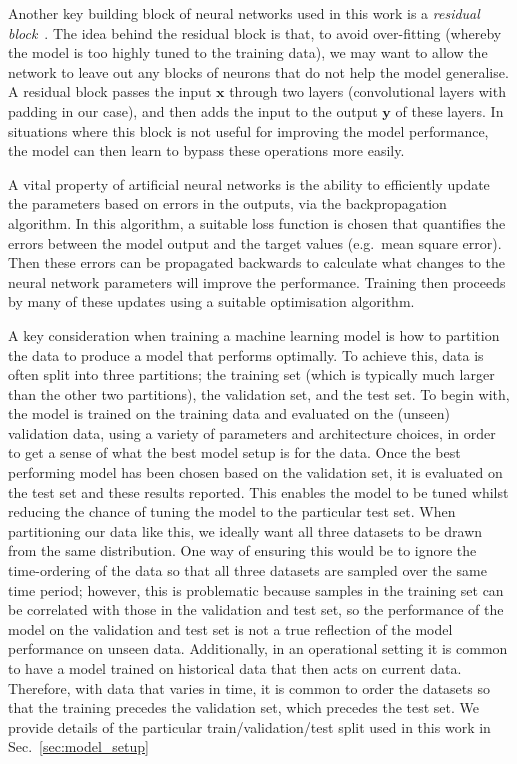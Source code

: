 \documentclass[../main.tex]{subfiles}
\begin{document}
Another key building block of neural networks used in this work is a \emph{residual block}~\citep{he_deep_2016}. The idea behind the residual block is that, to avoid over-fitting (whereby the model is too highly tuned to the training data), we may want to allow the network to leave out any blocks of neurons that do not help the model generalise. A residual block passes the input $\mathbf{x}$ through two layers (convolutional layers with padding in our case), and then adds the input to the output $\mathbf{y}$ of these layers. In situations where this block is not useful for improving the model performance, the model can then learn to bypass these operations more easily. 

A vital property of artificial neural networks is the ability to efficiently update the parameters based on errors in the outputs, via the backpropagation algorithm. In this algorithm, a suitable loss function is chosen that quantifies the errors between the model output and the target values (e.g.~mean square error). Then these errors can be propagated backwards to calculate what changes to the neural network parameters will improve the performance. Training then proceeds by many of these updates using a suitable optimisation algorithm.

A key consideration when training a machine learning model is how to partition the data to produce a model that performs optimally. To achieve this, data is often split into three partitions; the training set (which is typically much larger than the other two partitions), the validation set, and the test set. To begin with, the model is trained on the training data and evaluated on the (unseen) validation data, using a variety of parameters and architecture choices, in order to get a sense of what the best model setup is for the data. Once the best performing model has been chosen based on the validation set, it is evaluated on the test set and these results reported. This enables the model to be tuned whilst reducing the chance of tuning the model to the particular test set. When partitioning our data like this, we ideally want all three datasets to be drawn from the same distribution. One way of ensuring this would be to ignore the time-ordering of the data so that all three datasets are sampled over the same time period; however, this is problematic because samples in the training set can be correlated with those in the validation and test set, so the performance of the model on the validation and test set is not a true reflection of the model performance on unseen data. Additionally, in an operational setting it is common to have a model trained on historical data that then acts on current data. Therefore, with data that varies in time, it is common to order the datasets so that the training precedes the validation set, which precedes the test set. We provide details of the particular train/validation/test split used in this work in Sec.~\ref{sec:model_setup}
\end{document}
